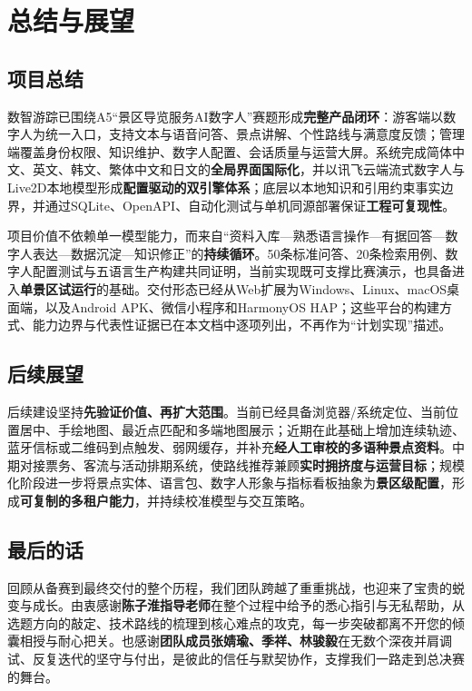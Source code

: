 \chapter{总结与展望}

\section{项目总结}

数智游踪已围绕A5“景区导览服务AI数字人”赛题形成\textbf{完整产品闭环}：游客端以数字人为统一入口，支持文本与语音问答、景点讲解、个性路线与满意度反馈；管理端覆盖身份权限、知识维护、数字人配置、会话质量与运营大屏。系统完成简体中文、英文、韩文、繁体中文和日文的\textbf{全局界面国际化}，并以讯飞云端流式数字人与Live2D本地模型形成\textbf{配置驱动的双引擎体系}；底层以本地知识和引用约束事实边界，并通过SQLite、OpenAPI、自动化测试与单机同源部署保证\textbf{工程可复现性}。

项目价值不依赖单一模型能力，而来自“资料入库—熟悉语言操作—有据回答—数字人表达—数据沉淀—知识修正”的\textbf{持续循环}。50条标准问答、20条检索用例、数字人配置测试与五语言生产构建共同证明，当前实现既可支撑比赛演示，也具备进入\textbf{单景区试运行}的基础。交付形态已经从Web扩展为Windows、Linux、macOS桌面端，以及Android APK、微信小程序和HarmonyOS HAP；这些平台的构建方式、能力边界与代表性证据已在本文档中逐项列出，不再作为“计划实现”描述。

\section{后续展望}

后续建设坚持\textbf{先验证价值、再扩大范围}。当前已经具备浏览器/系统定位、当前位置居中、手绘地图、最近点匹配和多端地图展示；近期在此基础上增加连续轨迹、蓝牙信标或二维码到点触发、弱网缓存，并补充\textbf{经人工审校的多语种景点资料}。中期对接票务、客流与活动排期系统，使路线推荐兼顾\textbf{实时拥挤度与运营目标}；规模化阶段进一步将景点实体、语言包、数字人形象与指标看板抽象为\textbf{景区级配置}，形成\textbf{可复制的多租户能力}，并持续校准模型与交互策略。

\section{最后的话}

回顾从备赛到最终交付的整个历程，我们团队跨越了重重挑战，也迎来了宝贵的蜕变与成长。由衷感谢\textbf{陈子淮指导老师}在整个过程中给予的悉心指引与无私帮助，从选题方向的敲定、技术路线的梳理到核心难点的攻克，每一步突破都离不开您的倾囊相授与耐心把关。也感谢\textbf{团队成员张婧瑜、季祥、林骏毅}在无数个深夜并肩调试、反复迭代的坚守与付出，是彼此的信任与默契协作，支撑我们一路走到总决赛的舞台。

